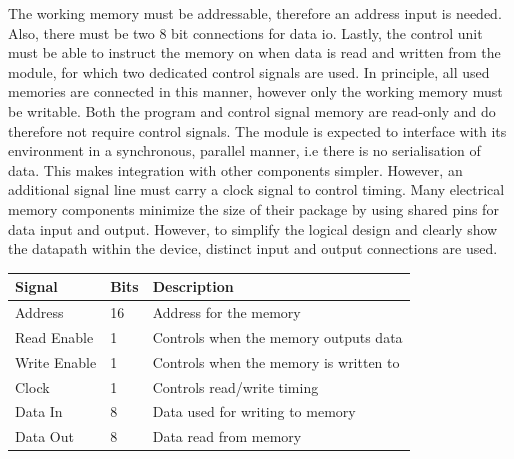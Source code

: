 The working memory must be addressable, therefore an address input is needed. Also, there must be two 8 bit connections for data \ac{io}. Lastly, the control unit must be able to instruct the memory on when data is read and written from the module, for which two dedicated control signals are used. In principle, all used memories are connected in this manner, however only the working memory must be writable. Both the program and control signal memory are read-only and do therefore not require control signals. The module is expected to interface with its environment in a synchronous, parallel manner, i.e there is no serialisation of data. This makes integration with other components simpler. However, an additional signal line must carry a clock signal to control timing. Many electrical memory components minimize the size of their package by using shared pins for data input and output. However, to simplify the logical design and clearly show the datapath within the device, distinct input and output connections are used.

\begin{table}[H]
    \centering
    \begin{tabular}{|l|l|l|} 
        \hline
        \textbf{\textbf{Signal}} & \textbf{Bits} & \textbf{Description}                    \\ 
        \hline
        Address                  & 16            & Address for the memory                  \\ 
        \hline
        Read Enable              & 1             & Controls when the memory outputs data   \\ 
        \hline
        Write Enable             & 1             & Controls when the memory is written to  \\ 
        \hline
        Clock                    & 1             & Controls read/write timing              \\ 
        \hline
        Data In                  & 8             & Data used for writing to memory         \\ 
        \hline
        Data Out                 & 8             & Data read from memory                   \\
        \hline
    \end{tabular}
\end{table}
\caption{Input and output signals of a memory unit. Only working memory requires read-enable, write-enable and clock lines.}
\label{tab:implementation_logical_memory_io}

